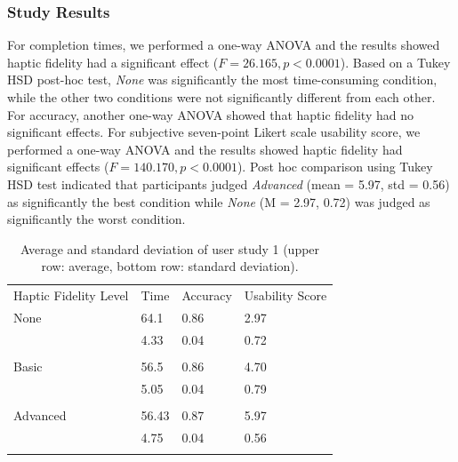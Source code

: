 \documentclass{svjour3}                     %
\begin{document}
{\subsubsection{Study Results}

For completion times, we performed a one-way ANOVA and the results showed haptic fidelity had a significant effect ($F = 26.165, p < 0.0001$).
%
Based on a Tukey HSD post-hoc test, \textit{None} was significantly the most time-consuming condition, while the other two conditions were not significantly different from each other.
For accuracy, another one-way ANOVA showed that haptic fidelity had no significant effects.
For subjective seven-point Likert scale usability score, we performed a one-way ANOVA and the results showed haptic fidelity had significant effects ($F = 140.170, p < 0.0001$).
%
Post hoc comparison using Tukey HSD test indicated that participants judged \textit{Advanced} (mean = 5.97, std = 0.56) as significantly the best condition while \textit{None} (M = 2.97, 0.72) was judged as significantly the worst condition.

\begin{table}
\caption{Average and standard deviation of user study 1 (upper row: average, bottom row: standard deviation).}
\label{tab:r1}       %
\begin{tabular}{llll}
\hline\noalign{\smallskip}
Haptic Fidelity Level & Time & Accuracy & Usability Score\\
\noalign{\smallskip}\hline\noalign{\smallskip}
None & 64.1 & 0.86 & 2.97 \\
 & 4.33 & 0.04 & 0.72 \\\\
Basic & 56.5 & 0.86 & 4.70 \\
 & 5.05 & 0.04 & 0.79 \\\\
Advanced & 56.43 & 0.87 & 5.97 \\
 & 4.75 & 0.04 & 0.56 \\
\noalign{\smallskip}\hline
\end{tabular}
\end{table}


}
\end{document}
